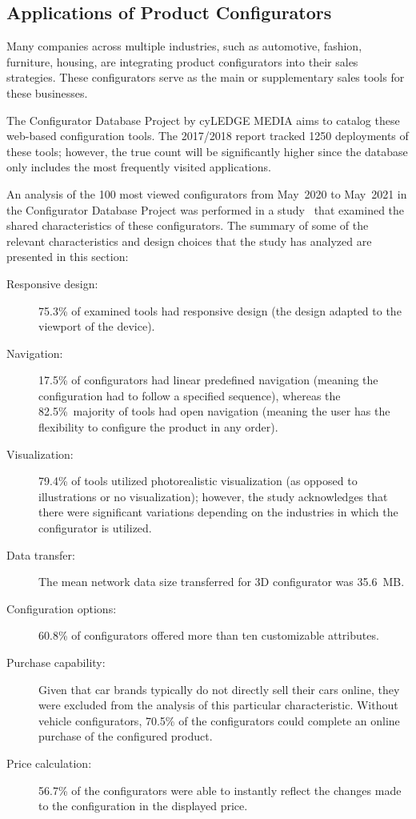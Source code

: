 \subsection{Applications of Product Configurators}

Many companies across multiple industries, such as automotive, fashion, furniture, housing, are integrating product configurators into their sales strategies. These configurators serve as the main or supplementary sales tools for these businesses.

The Configurator Database Project by cyLEDGE MEDIA aims to catalog these web-based configuration tools. The 2017/2018 report tracked 1250 deployments of these tools; however, the true count will be significantly higher since the database only includes the most frequently visited applications.~\cite{cyLEDGE2018}

An analysis of the 100 most viewed configurators from May~2020 to May~2021 in the Configurator Database Project was performed in a study~\cite{Blazek2023} that examined the shared characteristics of these configurators. The summary of some of the relevant characteristics and design choices that the study has analyzed are presented in this section:
\begin{description}
    \item[Responsive design:] 75.3\% of examined tools had responsive design (the design adapted to the viewport of the device).
    \item[Navigation:] 17.5\% of configurators had linear predefined navigation (meaning the configuration had to follow a specified sequence), whereas the 82.5\%~majority of tools had open navigation (meaning the user has the flexibility to configure the product in any order).
    \item[Visualization:] 79.4\% of tools utilized photorealistic visualization (as opposed to illustrations or no visualization); however, the study acknowledges that there were significant variations depending on the industries in which the configurator is utilized.
    \item[Data transfer:] The mean network data size transferred for 3D configurator was 35.6~MB.
    \item[Configuration options:] 60.8\% of configurators offered more than ten customizable attributes.
    \item[Purchase capability:] Given that car brands typically do not directly sell their cars online, they were excluded from the analysis of this particular characteristic. Without vehicle configurators, 70.5\% of the configurators could complete an online purchase of the configured product.
    \item[Price calculation:] 56.7\% of the configurators were able to instantly reflect the changes made to the configuration in the displayed price.
\end{description}

